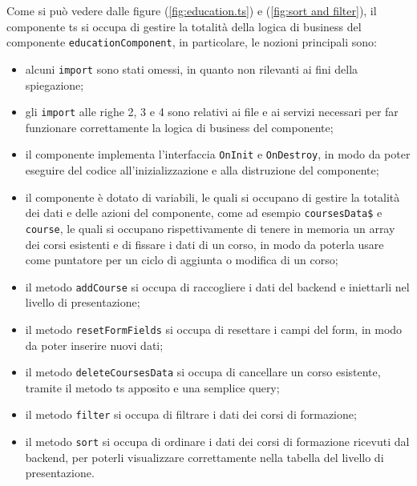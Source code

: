 Come si può vedere dalle figure (\ref{fig:education.ts}) e (\ref{fig:sort and filter}), il componente \acrshort{ts} si occupa di gestire la totalità della logica di business del componente \texttt{educationComponent}, in particolare, le nozioni principali sono:
\begin{itemize}
  \item alcuni \texttt{import} sono stati omessi, in quanto non rilevanti ai fini della spiegazione;
  \item gli \texttt{import} alle righe 2, 3 e 4 sono relativi ai file e ai servizi necessari per far funzionare correttamente la logica di business del componente;
  \item il componente implementa l'interfaccia \texttt{OnInit} e \texttt{OnDestroy}, in modo da poter eseguire del codice all'inizializzazione e alla distruzione del componente;
  \item il componente è dotato di variabili, le quali si occupano di gestire la totalità dei dati e delle azioni del componente, come ad esempio \texttt{coursesData\$} e \texttt{course}, le quali si occupano rispettivamente di tenere in memoria un array dei corsi esistenti e di fissare i dati di un corso, in modo da poterla usare come puntatore per un ciclo di aggiunta o modifica di un corso;
  \item il metodo \texttt{addCourse} si occupa di raccogliere i dati del backend e iniettarli nel livello di presentazione;
  \item il metodo \texttt{resetFormFields} si occupa di resettare i campi del form, in modo da poter inserire nuovi dati;
  \item il metodo \texttt{deleteCoursesData} si occupa di cancellare un corso esistente, tramite il metodo \acrshort{ts} apposito e una semplice query;
  \item il metodo \texttt{filter} si occupa di filtrare i dati dei corsi di formazione;
  \item il metodo \texttt{sort} si occupa di ordinare i dati dei corsi di formazione ricevuti dal backend, per poterli visualizzare correttamente nella tabella del livello di presentazione.
\end{itemize}

